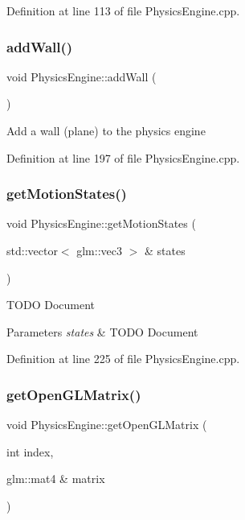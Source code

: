 Definition at line 113 of file Physics\+Engine.\+cpp.

\mbox{\label{class_physics_engine_ae51b6b3b006443af2dfd8a2c3ee503bb}} 
\subsubsection{\texorpdfstring{add\+Wall()}{addWall()}}
{\footnotesize\ttfamily void Physics\+Engine\+::add\+Wall (\begin{DoxyParamCaption}{ }\end{DoxyParamCaption})}

Add a wall (plane) to the physics engine 

Definition at line 197 of file Physics\+Engine.\+cpp.

\mbox{\label{class_physics_engine_a89715c2d36c8ab11960c5c1effe3ff57}} 
\subsubsection{\texorpdfstring{get\+Motion\+States()}{getMotionStates()}}
{\footnotesize\ttfamily void Physics\+Engine\+::get\+Motion\+States (\begin{DoxyParamCaption}\item[{std\+::vector$<$ glm\+::vec3 $>$ \&}]{states }\end{DoxyParamCaption})}

T\+O\+DO Document 
\begin{DoxyParams}{Parameters}
{\em states} & T\+O\+DO Document \\
\hline
\end{DoxyParams}


Definition at line 225 of file Physics\+Engine.\+cpp.

\mbox{\label{class_physics_engine_af272bdb214ae594852c8457e45e2b7e3}} 
\subsubsection{\texorpdfstring{get\+Open\+G\+L\+Matrix()}{getOpenGLMatrix()}}
{\footnotesize\ttfamily void Physics\+Engine\+::get\+Open\+G\+L\+Matrix (\begin{DoxyParamCaption}\item[{int}]{index,  }\item[{glm\+::mat4 \&}]{matrix }\end{DoxyParamCaption})}

